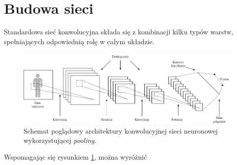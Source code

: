 \section{Budowa sieci}
\label{roz2.2}

\hspace{0.4cm}
Standardowa sieć konwolucyjna składa się z kombinacji kilku typów warstw, spełniających odpowiednią rolę w całym układzie.

\begin{figure}[H]
    \centering
    \includegraphics[width=\linewidth]{Obrazy/Rozdzial02/struktura.png}
    \caption{Schemat poglądowy architektury konwolucyjnej sieci neuronowej wykorzystującej \textit{pooling}.}
    \label{fig:struktura}
\end{figure}

\noindent
Wspomagając się rysunkiem \ref{fig:struktura}, można wyróżnić

